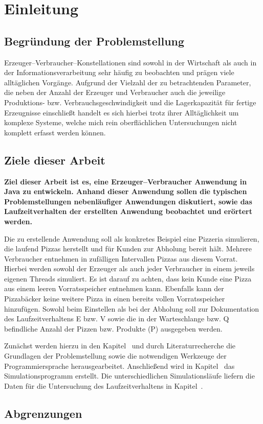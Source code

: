 \section{Einleitung} %
\label{sec:einleitung}

\subsection{Begründung der Problemstellung} %
\label{sub:begrundung_der_problemstellung}
Erzeuger–Verbraucher–Konstellationen sind sowohl in der Wirtschaft als auch in der Informationsverarbeitung sehr häufig zu beobachten und prägen viele alltäglichen Vorgänge. Aufgrund der Vielzahl der zu betrachtenden Parameter, die neben der Anzahl der Erzeuger und Verbraucher auch die jeweilige Produktions- bzw. Verbrauchsgeschwindigkeit und die Lagerkapazität für fertige Erzeugnisse einschließt handelt es sich hierbei trotz ihrer Alltäglichkeit um komplexe Systeme, welche mich rein oberflächlichen Untersuchungen nicht komplett erfasst werden können.


\subsection{Ziele dieser Arbeit} %
\label{sub:ziele_dieser_arbeit}
\textbf{Ziel dieser Arbeit ist es, eine Erzeuger–Verbraucher Anwendung in Java zu entwickeln. Anhand dieser Anwendung sollen die typischen Problemstellungen nebenläufiger Anwendungen diskutiert, sowie das Laufzeitverhalten der erstellten Anwendung beobachtet und erörtert werden.}

Die zu erstellende Anwendung soll als konkretes Beispiel eine Pizzeria simulieren, die laufend Pizzas herstellt und für Kunden zur Abholung bereit hält. Mehrere Verbraucher entnehmen in zufälligen Intervallen Pizzas aus diesem Vorrat. Hierbei werden sowohl der Erzeuger als auch jeder Verbraucher in einem jeweils eigenen Threads simuliert.  Es ist darauf zu achten, dass kein Kunde eine Pizza aus einem leeren Vorratsspeicher entnehmen kann. Ebenfalls kann der Pizzabäcker keine weitere Pizza in einen bereits vollen Vorratsspeicher hinzufügen. Sowohl beim Einstellen als bei der Abholung soll zur Dokumentation des Laufzeitverhaltens \ac{E} bzw. \ac{V} sowie die in der Warteschlange bzw. \ac{Q} befindliche Anzahl der Pizzen bzw. Produkte (P) ausgegeben werden.

Zunächst werden hierzu in den Kapitel~ und  durch Literaturrecherche die Grundlagen der Problemstellung sowie die notwendigen Werkzeuge der Programmiersprache herausgearbeitet. Anschließend wird in Kapitel~ das Simulationsprogramm erstellt. Die unterschiedlichen Simulationsläufe liefern die Daten für die Untersuchung des Laufzeitverhaltens in Kapitel~.


\subsection{Abgrenzungen} %
\label{sub:abgrenzungen}


